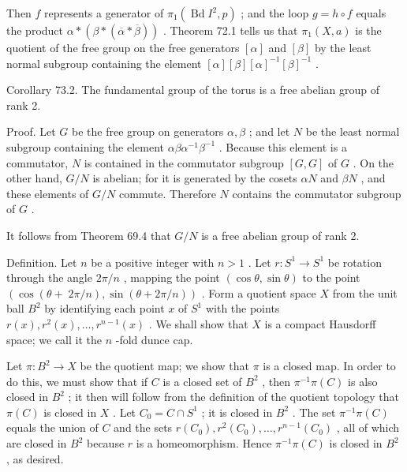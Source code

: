\documentclass[10pt]{article}
\begin{document}
Then \(f\) represents a generator of \({\pi }_{1}\left( {\operatorname{Bd}{I}^{2},p}\right)\) ; and the loop \(g = h \circ  f\) equals the product \(\alpha  * \left( {\beta  * \left( {\overline{\alpha } * \overline{\beta }}\right) }\right)\) . Theorem 72.1 tells us that \({\pi }_{1}\left( {X,a}\right)\) is the quotient of the free group on the free generators \(\left\lbrack  \alpha \right\rbrack\) and \(\left\lbrack  \beta \right\rbrack\) by the least normal subgroup containing the element \(\left\lbrack  \alpha \right\rbrack  \left\lbrack  \beta \right\rbrack  {\left\lbrack  \alpha \right\rbrack  }^{-1}{\left\lbrack  \beta \right\rbrack  }^{-1}\) .

Corollary 73.2. The fundamental group of the torus is a free abelian group of rank 2.

Proof. Let \(G\) be the free group on generators \(\alpha ,\beta\) ; and let \(N\) be the least normal subgroup containing the element \({\alpha \beta }{\alpha }^{-1}{\beta }^{-1}\) . Because this element is a commutator, \(N\) is contained in the commutator subgroup \(\left\lbrack  {G,G}\right\rbrack\) of \(G\) . On the other hand, \(G/N\) is abelian; for it is generated by the cosets \({\alpha N}\) and \({\beta N}\) , and these elements of \(G/N\) commute. Therefore \(N\) contains the commutator subgroup of \(G\) .

It follows from Theorem 69.4 that \(G/N\) is a free abelian group of rank 2.

Definition. Let \(n\) be a positive integer with \(n > 1\) . Let \(r : {S}^{1} \rightarrow  {S}^{1}\) be rotation through the angle \({2\pi }/n\) , mapping the point \(\left( {\cos \theta ,\sin \theta }\right)\) to the point \((\cos (\theta  + \; {2\pi }/n),\sin \left( {\theta  + {2\pi }/n}\right) )\) . Form a quotient space \(X\) from the unit ball \({B}^{2}\) by identifying each point \(x\) of \({S}^{1}\) with the points \(r\left( x\right) ,{r}^{2}\left( x\right) ,\ldots ,{r}^{n - 1}\left( x\right)\) . We shall show that \(X\) is a compact Hausdorff space; we call it the \(n\) -fold dunce cap.

Let \(\pi  : {B}^{2} \rightarrow  X\) be the quotient map; we show that \(\pi\) is a closed map. In order to do this, we must show that if \(C\) is a closed set of \({B}^{2}\) , then \({\pi }^{-1}\pi \left( C\right)\) is also closed in \({B}^{2}\) ; it then will follow from the definition of the quotient topology that \(\pi \left( C\right)\) is closed in \(X\) . Let \({C}_{0} = C \cap  {S}^{1}\) ; it is closed in \({B}^{2}\) . The set \({\pi }^{-1}\pi \left( C\right)\) equals the union of \(C\) and the sets \(r\left( {C}_{0}\right) ,{r}^{2}\left( {C}_{0}\right) ,\ldots ,{r}^{n - 1}\left( {C}_{0}\right)\) , all of which are closed in \({B}^{2}\) because \(r\) is a homeomorphism. Hence \({\pi }^{-1}\pi \left( C\right)\) is closed in \({B}^{2}\) , as desired.
\end{document}
